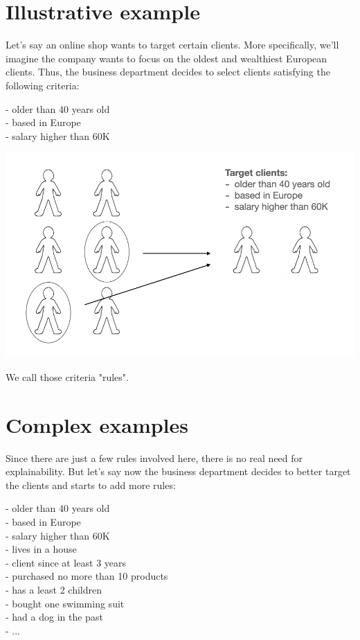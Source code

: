\section{Illustrative example}

\label{sec:illustrative-example}

Let's say an online shop wants to target certain clients. More specifically, we'll imagine the company wants to focus on the oldest and wealthiest European clients. Thus, the business department decides to select clients satisfying the following criteria: 

- older than 40 years old \\
- based in Europe \\
- salary higher than 60K \\

\begin{center}
\includegraphics[scale=0.5]{clients-filter.png}
\end{center}

We call those criteria "rules".

\section{Complex examples}

\label{sec:complex-example}

Since there are just a few rules involved here, there is no real need for explainability. But let's say now the business department decides to better target the clients and starts to add more rules:

- older than 40 years old \\
- based in Europe \\
- salary higher than 60K \\
- lives in a house \\
- client since at least 3 years \\
- purchased no more than 10 products \\
- has a least 2 children \\
- bought one swimming suit \\
- had a dog in the past \\
- ...

